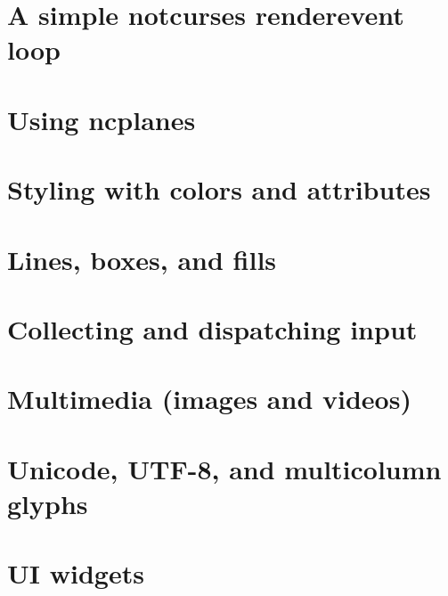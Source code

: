 \documentclass[letterpaper,10pt]{article}
\begin{document}
\section{A simple notcurses render\/event loop}
\newpage

\section{Using ncplanes}
\newpage

\section{Styling with colors and attributes}
\newpage

\section{Lines, boxes, and fills}
\newpage

\section{Collecting and dispatching input}
\newpage

\section{Multimedia (images and videos)}
\newpage

\section{Unicode, UTF-8, and multicolumn glyphs}
\newpage

\section{UI widgets}
\newpage
\end{document}
